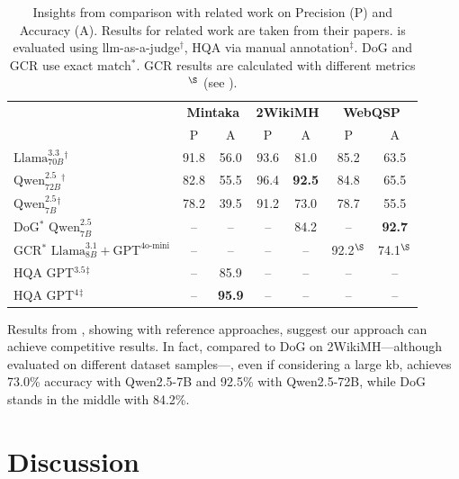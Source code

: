 \begin{table}[h!]
    \caption[Insights from comparison of  with related work.]{Insights from comparison with related work on Precision (P) and Accuracy (A). Results for related work are taken from their papers.  is evaluated using \ac{llm}-as-a-judge$^\dagger$, HQA via manual annotation$^\ddagger$. DoG and GCR use exact match$^*$. GCR results are calculated with different metrics$^{\S}$ (see ).}
    \label{tab:res-comparison-rw}
    \centering
\begin{tabular}{l|cc|cc|cc}
\toprule
 & \multicolumn{2}{c|}{\textbf{Mintaka}} & \multicolumn{2}{c|}{\textbf{2WikiMH}} & \multicolumn{2}{c}{\textbf{WebQSP}} \\
 & P & A & P & A & P & A \\
\midrule
\textbf{} $\text{Llama}^{3.3}_{70B}$$^\dagger$ & 91.8 & 56.0 & 93.6 & 81.0 & 85.2 & 63.5 \\
\textbf{} $\text{Qwen}^{2.5}_{72B}$$^\dagger$ & 82.8 & 55.5 & 96.4 & \textbf{92.5} & 84.8 & 65.5 \\
\textbf{} $\text{Qwen}^{2.5}_{7B}$$^\dagger$ & 78.2 & 39.5 & 91.2 & 73.0 & 78.7 & 55.5 \\
\midrule
DoG\cite{li-etal-2025-decoding-graphs}$^*$ $\text{Qwen}^{2.5}_{7B}$ & -- & -- & -- & 84.2 & -- & \textbf{92.7} \\
GCR\cite{luo2024graphconstrainedreasoningfaithfulreasoning}$^*$ $\text{Llama}^{3.1}_{8B} + \text{GPT}^{\text{4o-mini}}$ & -- & -- & -- & -- & 92.2$^{\S}$ & 74.1$^{\S}$ \\
HQA\cite{lehmann2024beyond} GPT$^{3.5}$$^\ddagger$ & -- & 85.9 & -- & -- & -- & -- \\
HQA\cite{lehmann2024beyond} GPT$^4$$^\ddagger$ & -- & \textbf{95.9} & -- & -- & -- & -- \\
\bottomrule
\end{tabular}
\end{table}

Results from , showing  with reference approaches, suggest our approach can achieve competitive results. In fact, compared to DoG on 2WikiMH---although evaluated on different dataset samples---, even if considering a large \ac{kb}, achieves 73.0\% accuracy with Qwen2.5-7B and 92.5\% with Qwen2.5-72B, while DoG stands in the middle with 84.2\%.



\section{Discussion}
\label{sec:rx:discussion}



